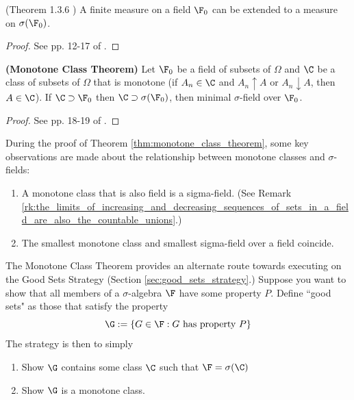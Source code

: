 \documentclass{article} %
\newenvironment{alphabate}
    {\begin{enumerate}[label=\alph*)]}
	{\end{enumerate} }
\begin{document}
 \begin{theorem}
 (Theorem 1.3.6 \cite{ash2000probability}) A finite measure on a field $\F_0$ can be extended to a measure on $\sigma(\F_0)$. 	
 \label{thm:extension_of_finite_measure}
 \end{theorem}

\begin{proof}
See pp. 12-17 of \cite{ash2000probability}.	
\end{proof}

\begin{theorem}{\textbf{(Monotone Class Theorem)}}
Let $\F_0$ be a field of subsets of $\Omega$ and $\C$ be a class of subsets of $\Omega$ that is monotone (if $A_n \in \C$ and $A_n \uparrow 
A$ or $A_n \downarrow A$, then $A \in \C$).  If $\C \supset \F_0$ then $\C \supset \sigma(\F_0)$, then minimal $\sigma$-field over $\F_0$. 
 \label{thm:monotone_class_theorem}
\end{theorem}

\begin{proof}
See pp. 18-19 of \cite{ash2000probability}.	
\end{proof}

\begin{remark}
During the proof of Theorem \ref{thm:monotone_class_theorem}, some key observations are made about the relationship between monotone classes and $\sigma$-fields:
\begin{alphabate}
\item A monotone class that is also field is a sigma-field.  (See Remark \ref{rk:the_limits_of_increasing_and_decreasing_sequences_of_sets_in_a_field_are_also_the_countable_unions}.)
\item The smallest monotone class and smallest sigma-field over a field coincide. 
\end{alphabate}
\label{rk:monotone_classes_and_sigma_fields}
\end{remark}

\begin{remark}{}
The Monotone Class Theorem provides an alternate route towards executing on the Good Sets Strategy (Section \ref{sec:good_sets_strategy}.)  Suppose you want to show that all members of a $\sigma$-algebra   $\F$ have some property $P$.  Define ``good sets" as those that satisfy the property
\[ \G := \{ G \in \F : G \text{ has property } P \} \]
The strategy is then to simply
\begin{enumerate}
\item Show $\G$ contains some class $\C$ such that $\F = \sigma(\C)$
\item Show $\G$ is a monotone class.  
\end{enumerate}	 
\label{rk:monotone_class_theorem_for_executing_good_sets_strategy}
\end{remark}
\end{document}
